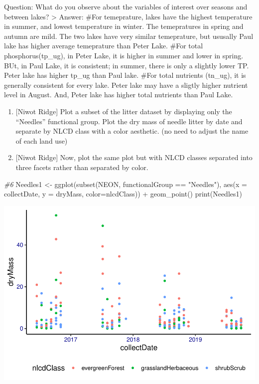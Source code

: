 \documentclass[]{article}
\newenvironment{Shaded}{\begin{snugshade}}{\end{snugshade}}
\newcommand{\AttributeTok}[1]{\textcolor[rgb]{0.77,0.63,0.00}{#1}}
\newcommand{\CommentTok}[1]{\textcolor[rgb]{0.56,0.35,0.01}{\textit{#1}}}
\newcommand{\FunctionTok}[1]{\textcolor[rgb]{0.00,0.00,0.00}{#1}}
\newcommand{\NormalTok}[1]{#1}
\newcommand{\OtherTok}[1]{\textcolor[rgb]{0.56,0.35,0.01}{#1}}
\newcommand{\SpecialCharTok}[1]{\textcolor[rgb]{0.00,0.00,0.00}{#1}}
\newcommand{\StringTok}[1]{\textcolor[rgb]{0.31,0.60,0.02}{#1}}
\begin{document}
Question: What do you observe about the variables of interest over
seasons and between lakes? \textgreater{} Answer: \#For temeprature,
lakes have the highest temperature in summer, and lowest temperature in
winter. The temepratures in spring and autumn are mild. The two lakes
have very similar temeprature, but ususally Paul lake has higher average
temeprature than Peter Lake. \#For total phosphorus(tp\_ug), in Peter
Lake, it is higher in summer and lower in spring. BUt, in Paul Lake, it
is consistent; in summer, there is only a slightly lower TP. Peter lake
has higher tp\_ug than Paul lake. \#For total nutrients (tn\_ug), it is
generally consistent for every lake. Peter lake may have a sligtly
higher nutrient level in August. And, Peter lake has higher total
nutrients than Paul Lake.

\begin{enumerate}
\def\labelenumi{\arabic{enumi}.}
\setcounter{enumi}{5}
\item
  {[}Niwot Ridge{]} Plot a subset of the litter dataset by displaying
  only the ``Needles'' functional group. Plot the dry mass of needle
  litter by date and separate by NLCD class with a color aesthetic. (no
  need to adjust the name of each land use)
\item
  {[}Niwot Ridge{]} Now, plot the same plot but with NLCD classes
  separated into three facets rather than separated by color.
\end{enumerate}

\begin{Shaded}
\begin{Highlighting}[]
\CommentTok{\#6}
\NormalTok{Needles1 }\OtherTok{\textless{}{-}} 
  \FunctionTok{ggplot}\NormalTok{(}\FunctionTok{subset}\NormalTok{(NEON, functionalGroup }\SpecialCharTok{==} \StringTok{"Needles"}\NormalTok{), }
         \FunctionTok{aes}\NormalTok{(}\AttributeTok{x =}\NormalTok{ collectDate, }\AttributeTok{y =}\NormalTok{ dryMass, }\AttributeTok{color=}\NormalTok{nlcdClass)) }\SpecialCharTok{+} 
  \FunctionTok{geom\_point}\NormalTok{()}
\FunctionTok{print}\NormalTok{(Needles1)}
\end{Highlighting}
\end{Shaded}

\includegraphics{A05_DataVisualization_files/figure-latex/unnamed-chunk-6-1.pdf}
\end{document}
